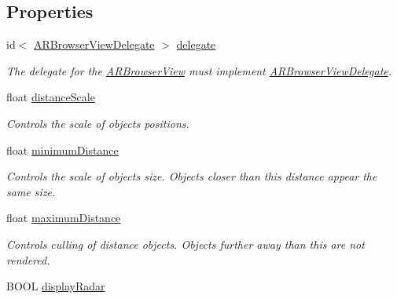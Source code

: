 \subsection*{Properties}
\begin{DoxyCompactItemize}
\item 
\hypertarget{interface_a_r_browser_view_ac71040f5d7529f5d1585f774524e6e48}{
id$<$ \hyperlink{protocol_a_r_browser_view_delegate-p}{ARBrowserViewDelegate} $>$ \hyperlink{interface_a_r_browser_view_ac71040f5d7529f5d1585f774524e6e48}{delegate}}
\label{interface_a_r_browser_view_ac71040f5d7529f5d1585f774524e6e48}

\begin{DoxyCompactList}\small\item\em The delegate for the \hyperlink{interface_a_r_browser_view}{ARBrowserView} must implement \hyperlink{protocol_a_r_browser_view_delegate-p}{ARBrowserViewDelegate}. \end{DoxyCompactList}\item 
float \hyperlink{interface_a_r_browser_view_a91aef66437e470e8f51b90f5f2ec613c}{distanceScale}
\begin{DoxyCompactList}\small\item\em Controls the scale of objects positions. \end{DoxyCompactList}\item 
\hypertarget{interface_a_r_browser_view_a4831f23b6b057d032491050a2dd826be}{
float \hyperlink{interface_a_r_browser_view_a4831f23b6b057d032491050a2dd826be}{minimumDistance}}
\label{interface_a_r_browser_view_a4831f23b6b057d032491050a2dd826be}

\begin{DoxyCompactList}\small\item\em Controls the scale of objects size. Objects closer than this distance appear the same size. \end{DoxyCompactList}\item 
\hypertarget{interface_a_r_browser_view_a3828caf0a7d28ba8e9417088ce4e736c}{
float \hyperlink{interface_a_r_browser_view_a3828caf0a7d28ba8e9417088ce4e736c}{maximumDistance}}
\label{interface_a_r_browser_view_a3828caf0a7d28ba8e9417088ce4e736c}

\begin{DoxyCompactList}\small\item\em Controls culling of distance objects. Objects further away than this are not rendered. \end{DoxyCompactList}\item 
\hypertarget{interface_a_r_browser_view_a541177be5371872bc4153d8eb8805ff2}{
BOOL \hyperlink{interface_a_r_browser_view_a541177be5371872bc4153d8eb8805ff2}{displayRadar}}
\label{interface_a_r_browser_view_a541177be5371872bc4153d8eb8805ff2}


\end{DoxyCompactItemize}
